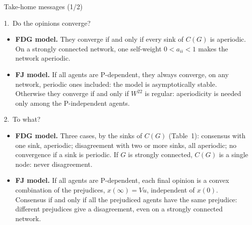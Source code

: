\documentclass[10pt, aspectratio=169]{beamer}
\newcommand{\compactblocks}{\setbeamerfont{block title}{size=\small}}
\begin{document}
\begin{frame}[label=m-messages]{Take-home messages (1/2)}
  \compactblocks
  \begin{alertblock}{1.\ Do the opinions converge?}
    \small
    \begin{itemize}\setlength{\itemsep}{1pt}
      \item \textbf{FDG model.} They converge if and only if every sink of $C(G)$ is
            aperiodic. On a strongly connected network, one self-weight $0 < a_{ii} < 1$
            makes the network aperiodic.
      \item \textbf{FJ model.} If all agents are P-dependent, they always converge, on any
            network, periodic ones included: the model is asymptotically stable. Otherwise
            they converge if and only if $W^{22}$ is regular: aperiodicity is needed only
            among the P-independent agents.
    \end{itemize}
  \end{alertblock}
  \begin{alertblock}{2.\ To what?}
    \small
    \begin{itemize}\setlength{\itemsep}{1pt}
      \item \textbf{FDG model.} Three cases, by the sinks of $C(G)$ (Table~1): consensus with
            one sink, aperiodic; disagreement with two or more sinks, all aperiodic; no
            convergence if a sink is periodic. If $G$ is strongly connected, $C(G)$ is a
            single node: never disagreement.
      \item \textbf{FJ model.} If all agents are P-dependent, each final opinion is a convex
            combination of the prejudices, $x(\infty) = Vu$, independent of $x(0)$. Consensus
            if and only if all the prejudiced agents have the same prejudice: different
            prejudices give a disagreement, even on a strongly connected network.
    \end{itemize}
  \end{alertblock}
\end{frame}
\end{document}
